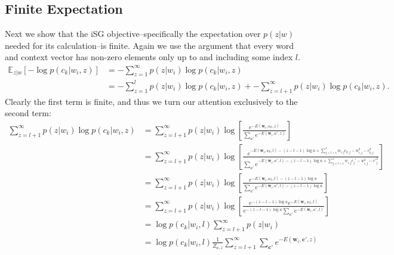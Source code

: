 \documentclass{article} %
\begin{document}
\subsection*{Finite Expectation}
Next we show that the iSG objective--specifically the expectation over $p(z|w)$ needed for its calculation--is finite.  Again we use the argument that every word and context vector has non-zero elements only up to and including some index $l$.  
\begin{equation*}\begin{split}\label{expectation_full}
\mathbb{E}_{z|w}[- \log p( c_{k}| w_{i}, z)] &= - \sum_{z=1}^{\infty} p(z | w_{i}) \log p(c_{k}| w_{i}, z) \\ &=  - \sum_{z=1}^{l} p(z | w_{i}) \log p(c_{k}| w_{i}, z) +  - \sum_{z=l+1}^{\infty} p(z | w_{i}) \log p(c_{k}| w_{i}, z) .\end{split}\end{equation*}  Clearly the first term is finite, and thus we turn our attention exclusively to the second term: \begin{equation*}\begin{split}\label{expectation_full2}
\sum_{z=l+1}^{\infty} p(z | w_{i}) \log p(c_{k}| w_{i}, z) &= \sum_{z=l+1}^{\infty} p(z | w_{i}) \log \left[ \frac{e^{-E(\mathbf{w}_{i}, \mathbf{c}_{k}, z)}}{ \sum_{\mathbf{c}'} e^{-E(\mathbf{w}_{i}, \mathbf{c}', z)} }  \right]  \\
&= \sum_{z=l+1}^{\infty} p(z | w_{i}) \log \left[ \frac{e^{-E(\mathbf{w}_{i}, \mathbf{c}_{k}, l) - (z-l-1)\log a + \sum_{j=l+1}^{z} w_{i,j}c_{k,j} - w_{i,j}^{2} - c_{k,j}^{2}}}{ \sum_{\mathbf{c}'} e^{-E(\mathbf{w}_{i}, \mathbf{c}', l) - (z-l-1)\log a + \sum_{j=l+1}^{z} w_{i,j}c_{j}' - w_{i,j}^{2} - {c'}_{j}^{2}} }  \right]  \\ 
&= \sum_{z=l+1}^{\infty} p(z | w_{i}) \log \left[ \frac{e^{-E(\mathbf{w}_{i}, \mathbf{c}_{k}, l) - (z-l-1)\log a }}{ \sum_{\mathbf{c}'} e^{-E(\mathbf{w}_{i}, \mathbf{c}', l) - (z-l-1)\log a } }  \right]  \\ 
&= \sum_{z=l+1}^{\infty} p(z | w_{i}) \log \left[ \frac{e^{- (z-l-1)\log a }e^{-E(\mathbf{w}_{i}, \mathbf{c}_{k}, l)}}{ e^{- (z-l-1)\log a }\sum_{\mathbf{c}'} e^{-E(\mathbf{w}_{i}, \mathbf{c}', l)  } }  \right]  \\ 
&= \log p(c_{k}| w_{i}, l) \sum_{z=l+1}^{\infty} p(z | w_{i})  \\ 
&= \log p(c_{k}| w_{i}, l) \frac{1}{Z_{\mathbf{c},z}} \sum_{z=l+1}^{\infty} \sum_{\mathbf{c}'}e^{-E(\mathbf{w}_{i}, \mathbf{c}', z)}  \\ 

\end{split}
\end{equation*}
\end{document}
